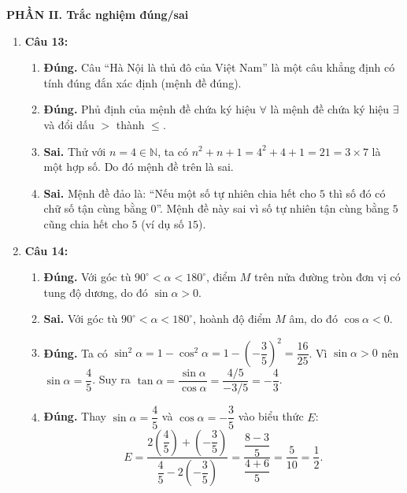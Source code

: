 \documentclass[12pt,a4paper]{article}
\begin{document}
\textbf{PHẦN II. Trắc nghiệm đúng/sai}
\begin{enumerate}[resume]
\item \textbf{Câu 13:}
\begin{enumerate}
    \item \textbf{Đúng.} Câu ``Hà Nội là thủ đô của Việt Nam'' là một câu khẳng định có tính đúng đắn xác định (mệnh đề đúng).
    \item \textbf{Đúng.} Phủ định của mệnh đề chứa ký hiệu $\forall$ là mệnh đề chứa ký hiệu $\exists$ và đổi dấu $>$ thành $\le$.
    \item \textbf{Sai.} Thử với $n = 4 \in \mathbb{N}$, ta có $n^2 + n + 1 = 4^2 + 4 + 1 = 21 = 3 \times 7$ là một hợp số. Do đó mệnh đề trên là sai.
    \item \textbf{Sai.} Mệnh đề đảo là: ``Nếu một số tự nhiên chia hết cho $5$ thì số đó có chữ số tận cùng bằng $0$''. Mệnh đề này sai vì số tự nhiên tận cùng bằng $5$ cũng chia hết cho $5$ (ví dụ số $15$).
\end{enumerate}

\item \textbf{Câu 14:}
\begin{enumerate}
    \item \textbf{Đúng.} Với góc tù $90^\circ < \alpha < 180^\circ$, điểm $M$ trên nửa đường tròn đơn vị có tung độ dương, do đó $\sin \alpha > 0$.
    \item \textbf{Sai.} Với góc tù $90^\circ < \alpha < 180^\circ$, hoành độ điểm $M$ âm, do đó $\cos \alpha < 0$.
    \item \textbf{Đúng.} Ta có $\sin^2 \alpha = 1 - \cos^2 \alpha = 1 - \left(-\dfrac{3}{5}\right)^2 = \dfrac{16}{25}$. Vì $\sin \alpha > 0$ nên $\sin \alpha = \dfrac{4}{5}$.
    Suy ra $\tan \alpha = \dfrac{\sin \alpha}{\cos \alpha} = \dfrac{4/5}{-3/5} = -\dfrac{4}{3}$.
    \item \textbf{Đúng.} Thay $\sin \alpha = \dfrac{4}{5}$ và $\cos \alpha = -\dfrac{3}{5}$ vào biểu thức $E$:
    \[
    E = \dfrac{2\left(\dfrac{4}{5}\right) + \left(-\dfrac{3}{5}\right)}{\dfrac{4}{5} - 2\left(-\dfrac{3}{5}\right)} = \dfrac{\dfrac{8 - 3}{5}}{\dfrac{4 + 6}{5}} = \dfrac{5}{10} = \dfrac{1}{2}.
    \]
\end{enumerate}
\end{enumerate}
\end{document}
